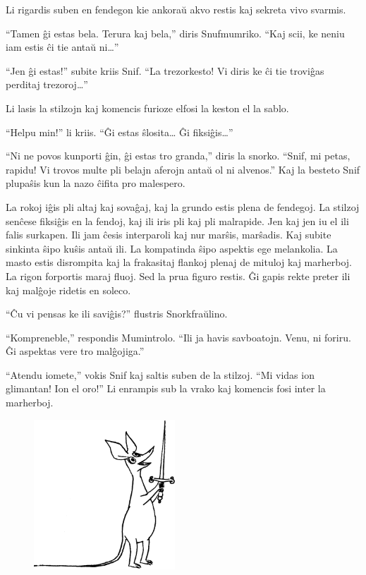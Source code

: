 Li rigardis suben en fendegon kie ankoraŭ akvo restis kaj sekreta vivo svarmis.

``Tamen ĝi estas bela. Terura kaj bela,'' diris Snufmumriko. ``Kaj scii, ke neniu iam estis ĉi tie antaŭ ni{\ldots}''

``Jen ĝi estas!'' subite kriis Snif. ``La trezorkesto! Vi diris ke ĉi tie troviĝas perditaj trezoroj{\ldots}''

Li lasis la stilzojn kaj komencis furioze elfosi la keston el la sablo.

``Helpu min!'' li kriis. ``Ĝi estas ŝlosita{\ldots} Ĝi fiksiĝis{\ldots}''

``Ni ne povos kunporti ĝin, ĝi estas tro granda,'' diris la snorko. ``Snif, mi petas, rapidu! Vi trovos multe pli belajn aferojn antaŭ ol ni alvenos.'' Kaj la besteto Snif plupaŝis kun la nazo ĉifita pro malespero.

La rokoj iĝis pli altaj kaj sovaĝaj, kaj la grundo estis plena de fendegoj. La stilzoj senĉese fiksiĝis en la fendoj, kaj ili iris pli kaj pli malrapide. Jen kaj jen iu el ili falis surkapen. Ili jam ĉesis interparoli kaj nur marŝis, marŝadis. Kaj subite sinkinta ŝipo kuŝis antaŭ ili. La kompatinda ŝipo aspektis ege melankolia. La masto estis disrompita kaj la frakasitaj flankoj plenaj de mituloj kaj marherboj. La rigon forportis maraj fluoj. Sed la prua figuro restis. Ĝi gapis rekte preter ili kaj malĝoje ridetis en soleco.

``Ĉu vi pensas ke ili saviĝis?'' flustris Snorkfraŭlino.

``Kompreneble,'' respondis Mumintrolo. ``Ili ja havis savboatojn. Venu, ni foriru. Ĝi aspektas vere tro malĝojiga.''

``Atendu iomete,'' vokis Snif kaj saltis suben de la stilzoj. ``Mi vidas ion glimantan! Ion el oro!'' Li enrampis sub la vrako kaj komencis fosi inter la marherboj.

\begin{figure}[htbp]
\centering
\includegraphics[width=150pt,height=159pt]{7-5.png}
\caption{}
\label{7-5}
\end{figure}

